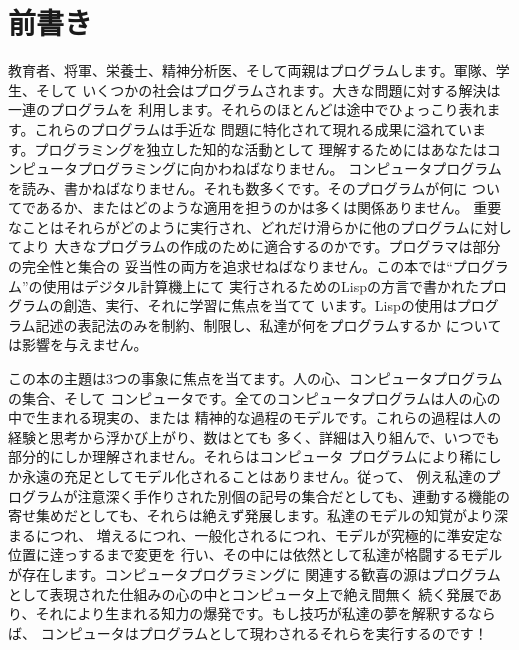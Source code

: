 \documentclass[oneside]{book}
\begin{document}


\chapter*{前書き}
\label{Foreword}

\vspace{-0.6em}


教育者、将軍、栄養士、精神分析医、そして両親はプログラムします。軍隊、学生、そして
いくつかの社会はプログラムされます。大きな問題に対する解決は一連のプログラムを
利用します。それらのほとんどは途中でひょっこり表れます。これらのプログラムは手近な
問題に特化されて現れる成果に溢れています。プログラミングを独立した知的な活動として
理解するためにはあなたはコンピュータプログラミングに向かわねばなりません。
コンピュータプログラムを読み、書かねばなりません。それも数多くです。そのプログラムが何に
ついてであるか、またはどのような適用を担うのかは多くは関係ありません。
重要なことはそれらがどのように実行され、どれだけ滑らかに他のプログラムに対してより
大きなプログラムの作成のために適合するのかです。プログラマは部分の完全性と集合の
妥当性の両方を追求せねばなりません。この本では``プログラム''の使用はデジタル計算機上にて
実行されるためのLispの方言で書かれたプログラムの創造、実行、それに学習に焦点を当てて
います。Lispの使用はプログラム記述の表記法のみを制約、制限し、私達が何をプログラムするか
については影響を与えません。


この本の主題は3つの事象に焦点を当てます。人の心、コンピュータプログラムの集合、そして
コンピュータです。全てのコンピュータプログラムは人の心の中で生まれる現実の、または
精神的な過程のモデルです。これらの過程は人の経験と思考から浮かび上がり、数はとても
多く、詳細は入り組んで、いつでも部分的にしか理解されません。それらはコンピュータ
プログラムにより稀にしか永遠の充足としてモデル化されることはありません。従って、
例え私達のプログラムが注意深く手作りされた別個の記号の集合だとしても、連動する機能の
寄せ集めだとしても、それらは絶えず発展します。私達のモデルの知覚がより深まるにつれ、
増えるにつれ、一般化されるにつれ、モデルが究極的に準安定な位置に逹っするまで変更を
行い、その中には依然として私達が格闘するモデルが存在します。コンピュータプログラミングに
関連する歓喜の源はプログラムとして表現された仕組みの心の中とコンピュータ上で絶え間無く
続く発展であり、それにより生まれる知力の爆発です。もし技巧が私達の夢を解釈するならば、
コンピュータはプログラムとして現わされるそれらを実行するのです！
\end{document}
